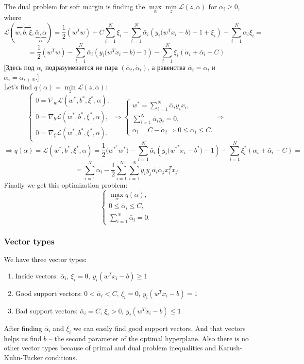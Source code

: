 The dual problem for soft margin is finding the $\max\limits_{\alpha}\min\limits_{z}\mathcal{L}(z,\alpha)$ for $\alpha_i\ge0$, where
$$\mathcal{L}(\overbrace{w,b,\xi}^{z},\underbrace{\bar\alpha,\dot\alpha}_{\alpha})=\frac{1}{2}(w^Tw)+C\sum\limits_{i=1}^{N}\xi_i-\sum\limits_{i=1}^{N}\bar\alpha_i(y_i\big(w^Tx_i-b\big)-1+\xi_i)-\sum\limits_{i=1}^{N}\dot\alpha_i\xi_i=$$
$$=\frac{1}{2}(w^Tw)-\sum\limits_{i=1}^{N}\bar\alpha_i(y_i\big(w^Tx_i-b\big)-1)-\sum\limits_{i=1}^{N}\xi_i(\dot\alpha_i+\bar\alpha_i-C)$$
[Здесь под $\alpha_i$ подразумевается не пара $(\bar\alpha_i,\dot\alpha_i)$, а равенства $\bar\alpha_i = \alpha_i$ и $\dot\alpha_i=\alpha_{i+N}$.]\\
Let's find $q(\alpha)=\min\limits_{z}\mathcal{L}(z,\alpha)$:
$$\begin{cases}
	0=\nabla_w\mathcal{L}(w^*,b^*,\xi^*,\alpha), \\
	0=\nabla_b\mathcal{L}(w^*,b^*,\xi^*,\alpha), \\
	0=\nabla_\xi\mathcal{L}(w^*,b^*,\xi^*,\alpha).
\end{cases}\Longrightarrow
\begin{cases}
	w^*=\sum\limits_{i=1}^{N}\bar\alpha_iy_ix_i, \\
	\sum\limits_{i=1}^{N}\bar\alpha_iy_i=0, \\
	\bar\alpha_i=C-\dot\alpha_i\Rightarrow 0\le\bar\alpha_i\le C.
\end{cases}\Longrightarrow$$
$$\Longrightarrow q(\alpha)=\mathcal{L}(w^*,b^*,\xi^*,\alpha)=\frac{1}{2}\big(w^{*^T}w^*\big)-\sum\limits_{i=1}^{N}\bar\alpha_i(y_i\big(w^{*^T}x_i-b^*\big)-1)-\sum\limits_{i=1}^{N}\xi_i^*(\dot\alpha_i+\bar\alpha_i-C)=$$
$$=\sum\limits_{i=1}^{N}\bar\alpha_i-\frac{1}{2}\sum\limits_{i=1}^{N}\sum\limits_{i=1}^{N}y_iy_j\bar\alpha_i\bar\alpha_jx_i^Tx_j$$
Finally we get this optimization problem:
$$\begin{cases}
	\max\limits_{\alpha}q(\alpha), \\
	0\le\bar\alpha_i\le C, \\
	\sum\limits_{i=1}^{N}\bar\alpha_i=0.
\end{cases}$$

\subsubsection*{Vector types}

We have three vector types:
\begin{enumerate}[label=\arabic*.]
	\item Inside vectors: $\bar\alpha_i$, $\xi_i=0$, $y_i(w^Tx_i-b)\ge1$
	\item Good support vectors: $0<\bar\alpha_i<C$, $\xi_i=0$, $y_i(w^Tx_i-b)=1$
	\item Bad support vectors: $\bar\alpha_i=C$, $\xi_i>0$, $y_i(w^Tx_i-b)\le1$
\end{enumerate}
After finding $\bar\alpha_i$ and $\xi_i$ we can easily find good support vectors. And that vectors helps us find $b$ -- the second parameter of the optimal hyperplane. Also there is no other vector types because of primal and dual problem inequalities and Karush-Kuhn-Tucker conditions.

